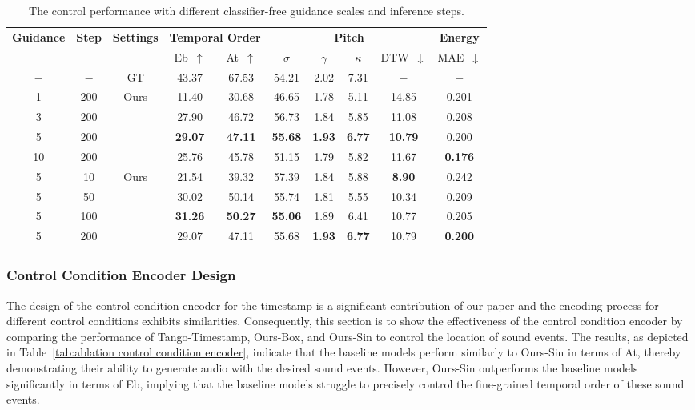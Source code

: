 \documentclass[letterpaper]{article} %
\begin{document}
\begin{table}[!t]
    \centering
    \caption{The control performance with different classifier-free guidance scales and inference steps.}
    \label{tab:classifier-Free guidance and inference steps}
        \begin{tabular}{cc|c|cc|cccc|c}
        \toprule
        \multirow{2}{*}{\textbf{Guidance}} & \multirow{2}{*}{\textbf{Step}} & \multirow{2}{*}{\textbf{Settings}} & \multicolumn{2}{c}{\textbf{Temporal Order}} & \multicolumn{4}{|c}{\textbf{Pitch}} & \multicolumn{1}{|c}{\textbf{Energy}} \\
        & &  & Eb~$\uparrow$ & At~$\uparrow$ & $\sigma$ & $\gamma$ & $\kappa$ & DTW~$\downarrow$ & MAE~$\downarrow$ \\
        \midrule
        \midrule
         $-$ & $-$ & GT & 43.37 & 67.53 & 54.21 & 2.02 & 7.31 & $-$ & $-$ \\
         \midrule
         1 & 200 & \multirow{4}{*}{Ours} & 11.40 & 30.68 & 46.65 & 1.78 & 5.11 & 14.85 & 0.201 \\
         3 & 200 & & 27.90 & 46.72 & 56.73 & 1.84 & 5.85 & 11,08 & 0.208 \\
         5 & 200 & &  \textbf{29.07} & \textbf{47.11} & \textbf{55.68} & \textbf{1.93} & \textbf{6.77} & \textbf{10.79} & 0.200 \\
         10 & 200 & &  25.76 & 45.78 & 51.15 & 1.79 & 5.82 & 11.67 & \textbf{0.176} \\
         \midrule
         5 & 10 & \multirow{4}{*}{Ours} &  21.54 & 39.32 & 57.39 & 1.84 & 5.88 & \textbf{8.90} & 0.242 \\
         5 & 50 & &  30.02 & 50.14 & 55.74 & 1.81 & 5.55 & 10.34 & 0.209 \\
         5 & 100 & & \textbf{31.26} & \textbf{50.27} & \textbf{55.06} & 1.89 & 6.41 & 10.77 & 0.205 \\
         5 & 200 & &  29.07 & 47.11 & 55.68 & \textbf{1.93} & \textbf{6.77} & 10.79 & \textbf{0.200} \\
        \bottomrule
        \end{tabular}
\end{table}

\subsubsection{Control Condition Encoder Design} The design of the control condition encoder for the timestamp is a significant contribution of our paper and the encoding process for different control conditions exhibits similarities. Consequently, this section is to show the effectiveness of the control condition encoder by comparing the performance of Tango-Timestamp, Ours-Box, and Ours-Sin to control the location of sound events. The results, as depicted in Table~\ref{tab:ablation control condition encoder}, indicate that the baseline models perform similarly to Ours-Sin in terms of At, thereby demonstrating their ability to generate audio with the desired sound events. However, Ours-Sin outperforms the baseline models significantly in terms of Eb, implying that the baseline models struggle to precisely control the fine-grained temporal order of these sound events.
\end{document}

